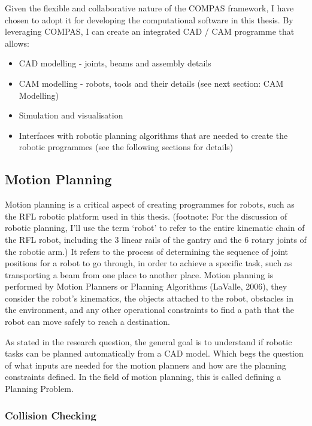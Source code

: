 Given the flexible and collaborative nature of the COMPAS framework, I have chosen to adopt it for developing the computational software in this thesis. By leveraging COMPAS, I can create an integrated CAD / CAM programme that allows:
\begin{itemize}
    \item CAD modelling - joints, beams and assembly details
    \item CAM modelling - robots, tools and their details (see next section: CAM Modelling)
    \item Simulation and visualisation
    \item Interfaces with robotic planning algorithms that are needed to create the robotic programmes (see the following sections for details)
\end{itemize}

\subsection{Motion Planning}

Motion planning is a critical aspect of creating programmes for robots, such as the RFL robotic platform used in this thesis. (footnote: For the discussion of robotic planning, I’ll use the term ‘robot’ to refer to the entire kinematic chain of the RFL robot, including the 3 linear rails of the gantry and the 6 rotary joints of the robotic arm.) It refers to the process of determining the sequence of joint positions for a robot to go through, in order to achieve a specific task, such as transporting a beam from one place to another place. Motion planning is performed by Motion Planners or Planning Algorithms (LaValle, 2006), they consider the robot's kinematics, the objects attached to the robot, obstacles in the environment, and any other operational constraints to find a path that the robot can move safely to reach a destination.

As stated in the research question, the general goal is to understand if robotic tasks can be planned automatically from a CAD model. Which begs the question of what inputs are needed for the motion planners and how are the planning constraints defined. In the field of motion planning, this is called defining a Planning Problem.

\subsubsection{Collision Checking}

